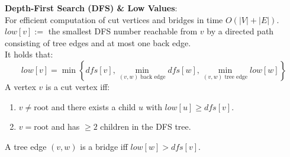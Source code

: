 \begin{algorithm}

\textbf{Depth-First Search (DFS) \& Low Values}:\\

                For efficient computation of cut vertices and bridges in time $O(|V|+|E|)$.
                \\

                $low[v] :=$ the smallest DFS number reachable from $v$ by a directed path consisting of tree edges and
                at most one back edge.
                \\

                It holds that:
                $$low[v] = \min \left\{ df s[v], \min_{(v,w) \text{ back edge}} df s[w], \min_{(v,w) \text{ tree edge}}
                low[w] \right\}$$
                A vertex $v$ is a cut vertex iff:
                \begin{enumerate}
    \item $v \neq \text{root}$ and there exists a child $u$ with $low[u] \ge df s[v]$.
    \item $v = \text{root}$ and has $\ge 2$ children in the DFS tree.
\end{enumerate}

                A tree edge $(v,w)$ is a bridge iff $low[w] \gt df s[v]$.
            
\end{algorithm}

